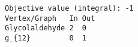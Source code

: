 \begin{verbatim}
Objective value (integral): -1
Vertex/Graph   In Out 
Glycolaldehyde 2  0   
g_{12}         0  1   
\end{verbatim}
